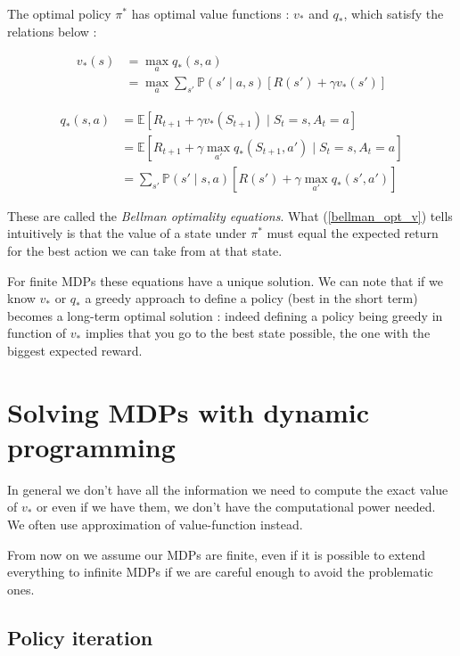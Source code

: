 \documentclass[14pt,a4paper]{article}
\theoremstyle{definition}
\begin{document}
The optimal policy $\pi^*$ has  optimal value functions : $v_* $ and $ q_*$, which satisfy the relations below : 

\begin{equation}
\begin{split}
v_{*}(s)&=\max_{a}q_{*}(s,a)
\\&=\max_{a} \sum_{s'}\mathbb{P}(s'\mid a,s)\left[R(s')+\gamma v_{*}(s')\right]
\end{split}
\label{bellman_opt_v}
\end{equation}

\begin{equation}
\begin{split}
q_{*}(s,a)&=\mathbb{E}\left[ R_{t+1} + \gamma v_{*}(S_ {t+1}) \mid S_t = s, A_t = a \right]
\\&=\mathbb{E}\left[ R_{t+1} + \gamma \max_{a'} q_{*}(S_{t+1},a') \mid S_t = s, A_t = a \right]
\\&= \sum_{s'}\mathbb{P}(s' \mid s,a)[R(s')+\gamma \max_{a'}q_{*}(s',a')]
\end{split}
\label{bellman_opt_q}
\end{equation}

These are called the \emph{Bellman optimality equations}. What (\ref{bellman_opt_v}) tells intuitively is that the value of a state under $\pi^*$ must equal the expected return for the best action we can take from at that state.


For finite MDPs these equations have a unique solution. We can note that if we know $v_{*}$ or $q_{*}$ a greedy approach to define a policy (best in the short term) becomes a long-term optimal solution : indeed defining a policy being greedy in function of $v_*$ implies that you go to the best state possible, the one with the biggest expected reward.


\section{Solving MDPs with dynamic programming}

In general we don't have all the information we need to compute the exact value of $v_{*}$ or even if we have them, we don't have the computational 
power needed. We often use approximation of value-function instead.


From now on we assume our MDPs are finite, even if it is possible to extend everything to infinite MDPs if we are careful enough to avoid the problematic ones. \citep{Sutton}

\subsection{Policy iteration}
\end{document}
